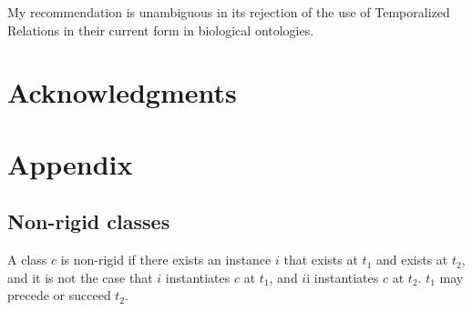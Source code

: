 \documentclass{bioinfo}
\begin{document}
My recommendation is unambiguous in its rejection of the use of
Temporalized Relations in their current form in biological ontologies.

\section*{Acknowledgments}







\newpage
\section*{Appendix}

\subsection{Non-rigid classes}

A class $c$ is non-rigid if there exists an instance $i$ that exists
at $t_1$ and exists at $t_2$, and it is not the case that $i$
instantiates $c$ at $t_1$, and $i$i instantiates $c$ at $t_2$. $t_1$
may precede or succeed $t_2$.
\end{document}
